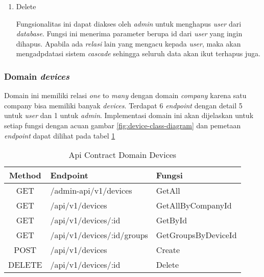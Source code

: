 \begin{enumerate}
        Fungsionalitas ini menerima masukan berupa json yang dengan \textit{field} \textit{name}, \textit{email}, \textit{password}, serta \textit{company\textunderscore id} dari \textit{requester}. Seluruh \textit{field} tersebut digunakan untuk membuat objek user pada \textit{database}. Pada fungsi ini akan dilakukan pengecekan apakah \textit{email} valid dan \textit{unique}. Selain itu ada validasi \textit{company\textunderscore id} agar dipastikan bahwa \textit{user} benar terdaftar ke \textit{company} yang sesuai. Apabila validasi tidak berhasil maka akan dikeluarkan pesan error, namun jika semua berhasil dilewati maka akan dikembalikan \textit{response} berupa \textit{user} yang telah dibuat pada database.

  \item Delete

        Fungsionalitas ini dapat diakses oleh \textit{admin} untuk menghapus \textit{user} dari \textit{database}. Fungsi ini menerima parameter berupa id dari \textit{user} yang ingin dihapus. Apabila ada \textit{relasi} lain yang mengacu kepada \textit{user}, maka akan mengadpdatasi sistem \textit{cascade} sehingga seluruh data akan ikut terhapus juga.

\end{enumerate}

\subsubsection{Domain \textit{devices}}

Domain ini memiliki relasi \textit{one} to \textit{many} dengan domain \textit{company} karena satu company bisa memiliki banyak \textit{devices}. Terdapat 6 \textit{endpoint} dengan detail 5 untuk \textit{user} dan 1 untuk \textit{admin}. Implementasi  domain ini akan dijelaskan untuk setiap fungsi dengan acuan gambar \ref{fig:device-class-diagram} dan pemetaan \textit{endpoint} dapat dilihat pada tabel \ref{tab:api-contract-domain-device}

\bgroup
\begin{table}[ht]
  \caption{Api Contract Domain Devices}
  \label{tab:api-contract-domain-device}
  \def\arraystretch{1.7}
  \centering
  \begin{tabular}{|c|p{6cm}|p{4cm}|}
    \hline
    Method & Endpoint                   &
    Fungsi                                                    \\
    \hline
    GET    & /admin-api/v1/devices      & GetAll              \\
    \hline
    GET    & /api/v1/devices            & GetAllByCompanyId   \\
    \hline
    GET    & /api/v1/devices/:id        & GetById             \\
    \hline
    GET    & /api/v1/devices/:id/groups & GetGroupsByDeviceId \\
    \hline
    POST   & /api/v1/devices            & Create              \\
    \hline
    DELETE & /api/v1/devices/:id        & Delete              \\
    \hline
  \end{tabular}
\end{table}
\egroup


